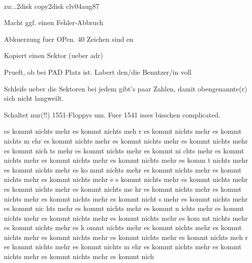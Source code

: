                                          
                                        
\\ zu:..2disk copy2disk       clv04aug87 
                                         
                                         
Macht ggf. einen Fehler-Abbruch          
                                         
                                         
                                         
Abkuerzung fuer OPen. 40 Zeichen sind en 
                                         
Kopiert einen Sektor (ueber adr)         
                                         
                                         
                                         
                                         
                                         
 Prueft, ob bei PAD Platz ist.           
 Labert den/die Benutzer/in voll         
                                         
 Schleife ueber die Sektoren             
 bei jedem gibt's paar Zahlen, damit     
 obengenannte(r) sich nicht langweilt.   
                                         
 Schaltet nur(!!) 1551-Floppys um.       
 Fuer 1541 isses bisschen complicated.   
                                        
es kommt nichts mehr es kommt nichts meh 
r es kommt nichts mehr es kommt nichts m 
ehr es kommt nichts mehr es kommt nichts 
 mehr es kommt nichts mehr es kommt nich 
ts mehr es kommt nichts mehr es kommt ni 
chts mehr es kommt nichts mehr es kommt  
nichts mehr es kommt nichts mehr es komm 
t nichts mehr es kommt nichts mehr es ko 
mmt nichts mehr es kommt nichts mehr es  
kommt nichts mehr es kommt nichts mehr e 
s kommt nichts mehr es kommt nichts mehr 
 es kommt nichts mehr es kommt nichts me 
hr es kommt nichts mehr es kommt nichts  
mehr es kommt nichts mehr es kommt nicht 
s mehr es kommt nichts mehr es kommt nic 
hts mehr es kommt nichts mehr es kommt n 
ichts mehr es kommt nichts mehr es kommt 
 nichts mehr es kommt nichts mehr es kom 
mt nichts mehr es kommt nichts mehr es k 
ommt nichts mehr es kommt nichts mehr es 
 kommt nichts mehr es kommt nichts mehr  
es kommt nichts mehr es kommt nichts meh 
r es kommt nichts mehr es kommt nichts m 
ehr es kommt nichts mehr es kommt nichts 
 mehr es kommt nichts mehr es kommt nich
